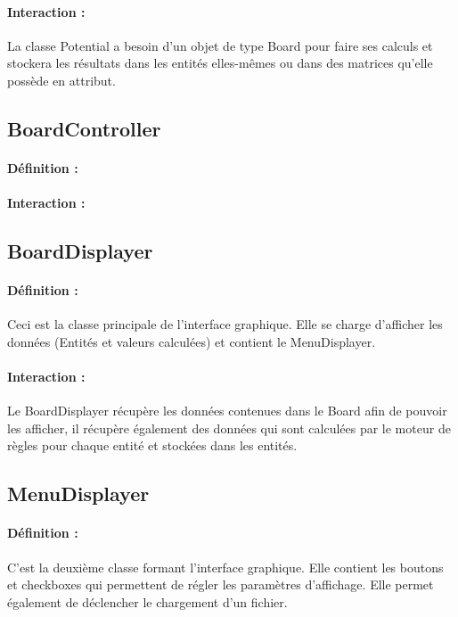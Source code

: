 			\paragraph{Interaction :}
			La classe Potential a besoin d'un objet de type Board pour faire ses calculs et stockera les résultats dans les 
			entités elles-mêmes ou dans des matrices qu'elle possède en attribut.

		\subsection*{BoardController}

			\paragraph{Définition :}
			
			\paragraph{Interaction :}
		

		\subsection*{BoardDisplayer}

			\paragraph{Définition :}
			Ceci est la classe principale de l'interface graphique. Elle se charge d'afficher les données (Entités et valeurs calculées)
			et contient le MenuDisplayer.
			\paragraph{Interaction :}
			Le BoardDisplayer récupère les données contenues dans le Board afin de pouvoir les afficher, il récupère également des données qui sont calculées
			par le moteur de règles pour chaque entité et stockées dans les entités.

		\subsection*{MenuDisplayer}

			\paragraph{Définition :}
			C'est la deuxième classe formant l'interface graphique. Elle contient les boutons et checkboxes qui permettent
			de régler les paramètres d'affichage. Elle permet également de déclencher le chargement d'un fichier.
